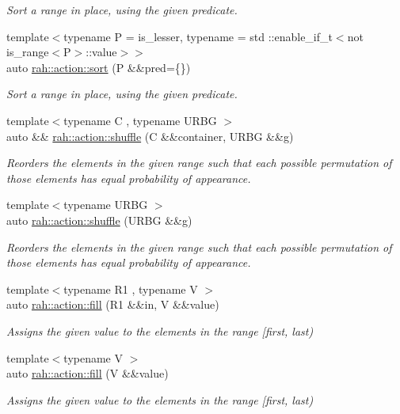 \begin{DoxyCompactItemize}
\begin{DoxyCompactList}\small\item\em Sort a range in place, using the given predicate. \end{DoxyCompactList}\item 
{\footnotesize template$<$typename P  = is\+\_\+lesser, typename  = std \+::enable\+\_\+if\+\_\+t$<$not is\+\_\+range$<$\+P$>$\+::value$>$$>$ }\\auto \mbox{\hyperlink{namespacerah_1_1action_ac1603fdf8fc87e84c277c216a5176674}{rah\+::action\+::sort}} (P \&\&pred=\{\})
\begin{DoxyCompactList}\small\item\em Sort a range in place, using the given predicate. \end{DoxyCompactList}\item 
{\footnotesize template$<$typename C , typename U\+R\+BG $>$ }\\auto \&\& \mbox{\hyperlink{namespacerah_1_1action_ae775b99f4520e9cb7ef61acb3fccb1ca}{rah\+::action\+::shuffle}} (C \&\&container, U\+R\+BG \&\&g)
\begin{DoxyCompactList}\small\item\em Reorders the elements in the given range such that each possible permutation of those elements has equal probability of appearance. \end{DoxyCompactList}\item 
{\footnotesize template$<$typename U\+R\+BG $>$ }\\auto \mbox{\hyperlink{namespacerah_1_1action_add6b8e704a8e603302290792a45a5c06}{rah\+::action\+::shuffle}} (U\+R\+BG \&\&g)
\begin{DoxyCompactList}\small\item\em Reorders the elements in the given range such that each possible permutation of those elements has equal probability of appearance. \end{DoxyCompactList}\item 
{\footnotesize template$<$typename R1 , typename V $>$ }\\auto \mbox{\hyperlink{namespacerah_1_1action_afee3c0ce8604f13a4e8a6f1975d335f6}{rah\+::action\+::fill}} (R1 \&\&in, V \&\&value)
\begin{DoxyCompactList}\small\item\em Assigns the given value to the elements in the range \mbox{[}first, last) \end{DoxyCompactList}\item 
{\footnotesize template$<$typename V $>$ }\\auto \mbox{\hyperlink{namespacerah_1_1action_a551824ac5386f3feb4c54ca097b76b92}{rah\+::action\+::fill}} (V \&\&value)
\begin{DoxyCompactList}\small\item\em Assigns the given value to the elements in the range \mbox{[}first, last) \end{DoxyCompactList}\end{DoxyCompactItemize}

